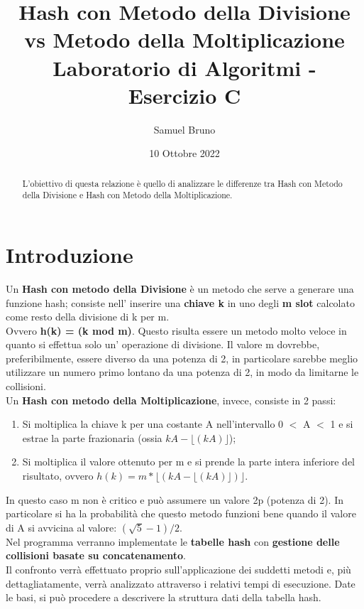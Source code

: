 \documentclass{article}
\title{Hash con Metodo della Divisione vs Metodo della Moltiplicazione \\
       \large Laboratorio di Algoritmi - Esercizio C}
\author{Samuel Bruno}
\date{10 Ottobre 2022}
\begin{document}
\maketitle

\begin{abstract}
L'obiettivo di questa relazione è quello di analizzare le differenze tra Hash con Metodo della Divisione e Hash con Metodo della Moltiplicazione.
\end{abstract}

\section{Introduzione}
Un \textbf{Hash con metodo della Divisione} è un metodo che serve a generare una funzione hash; consiste nell' inserire una \textbf{chiave k} in uno degli \textbf{m slot} calcolato come resto della divisione di k per m. \\ 
Ovvero \textbf{h(k) = (k mod m)}.
Questo risulta essere un metodo molto veloce in quanto si effettua solo un' operazione di divisione.
Il valore m dovrebbe, preferibilmente, essere diverso da una potenza di 2, in particolare sarebbe meglio utilizzare un numero primo lontano da una
potenza di 2, in modo da limitarne le collisioni. \\

Un \textbf{Hash con metodo della Moltiplicazione}, invece, consiste in 2 passi:
\begin{enumerate}[label={\roman*.)}, ref={\roman*.)}]
    \item Si moltiplica la chiave k per una costante A nell’intervallo 0 $<$ A $<$ 1 e si estrae la parte frazionaria (ossia $kA - \lfloor(kA)\rfloor$);
    \item Si moltiplica il valore ottenuto per m e si prende la parte intera inferiore del risultato, ovvero \textbf{$h(k) = m * \lfloor(kA - \lfloor(kA)\rfloor)\rfloor$}.
\end{enumerate}
In questo caso m non è critico e può assumere un valore 2p (potenza di 2). 
In particolare si ha la probabilità che questo metodo funzioni bene quando il valore di A si avvicina al valore: \textbf{$(\sqrt{5} -1)/2$}. \\

Nel programma verranno implementate le \textbf{tabelle hash} con \textbf{gestione delle collisioni basate su concatenamento}.\\
Il confronto verrà effettuato proprio sull'applicazione dei suddetti metodi e, più dettagliatamente, verrà analizzato attraverso i relativi tempi di esecuzione.
Date le basi, si può procedere a descrivere la struttura dati della tabella hash.
\end{document}
